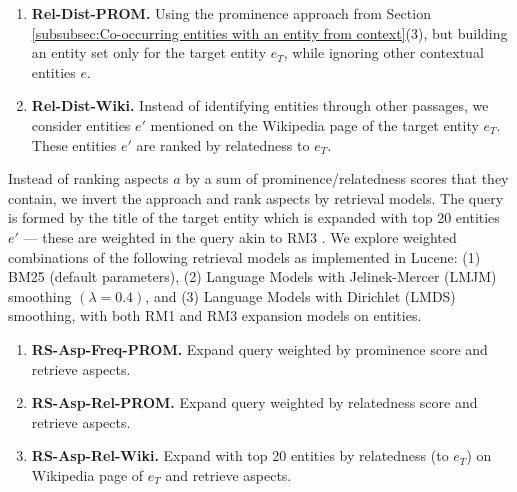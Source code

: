 \begin{enumerate}
    \item \textbf{Rel-Dist-PROM.} Using the prominence approach from Section \ref{subsubsec:Co-occurring entities with an entity from context}(3), but building an entity set only for the target entity $e_T$, while ignoring other contextual entities $e$.
    \item \textbf{Rel-Dist-Wiki.} Instead of identifying entities through other passages, we consider entities $e'$ mentioned on the Wikipedia page of the target entity $e_T$. These entities $e'$ are ranked by relatedness to $e_T$.
\end{enumerate}

Instead of ranking aspects $a$ by a sum of prominence/relatedness scores that they contain, we invert the approach and rank aspects by retrieval models. The query is formed by the title of the target entity which is expanded with top 20 entities $e'$ --- these are weighted in the query akin to RM3 \cite{lavrenko2001relevance}. We explore weighted combinations of the following retrieval models as implemented in Lucene: (1) BM25 (default parameters), (2) Language Models with Jelinek-Mercer (LMJM) smoothing $(\lambda = 0.4)$, and (3) Language Models with Dirichlet (LMDS) smoothing, with both RM1 and RM3 expansion models on entities.


    
\begin{enumerate}        
    \item \textbf{RS-Asp-Freq-PROM.} Expand query weighted by prominence score and retrieve aspects.
    \item \textbf{RS-Asp-Rel-PROM.} Expand query weighted by relatedness score and retrieve aspects.
    \item \textbf{RS-Asp-Rel-Wiki.} Expand with top 20 entities by relatedness (to $e_T$) on Wikipedia page of $e_T$ and retrieve aspects.
\end{enumerate}




 


